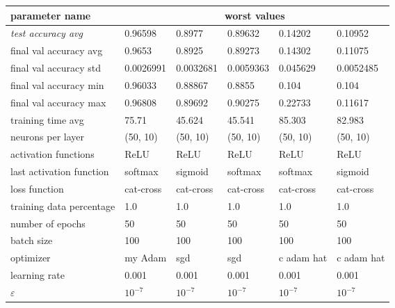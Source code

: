 \begin{longtable}{|l|l|l|l|l|>{\columncolor{worstColumnColor}}l|}
\hline
\textbf{parameter name} & \multicolumn{5}{c|}{\textbf{worst values}} \\
\hline
\textit{test accuracy avg} & 0.96598 &  0.8977 & 0.89632 & 0.14202 & 0.10952 \\
final val accuracy avg   & 0.9653  & 0.8925  & 0.89273 & 0.14302 & 0.11075 \\
final val accuracy std   & 0.0026991 & 0.0032681 & 0.0059363 & 0.045629 & 0.0052485 \\
final val accuracy min   & 0.96033 & 0.88867 & 0.8855  & 0.104   & 0.104   \\
final val accuracy max   & 0.96808 & 0.89692 & 0.90275 & 0.22733 & 0.11617 \\
training time avg        & 75.71   & 45.624  & 45.541  & 85.303  & 82.983  \\
{\color{equalParamColor} neurons per layer } & {\color{equalParamColor} (50, 10) } & {\color{equalParamColor} (50, 10) } & {\color{equalParamColor} (50, 10) } & {\color{equalParamColor} (50, 10) } & {\color{equalParamColor} (50, 10) } \\
{\color{equalParamColor} activation functions } & {\color{equalParamColor} ReLU } & {\color{equalParamColor} ReLU } & {\color{equalParamColor} ReLU } & {\color{equalParamColor} ReLU } & {\color{equalParamColor} ReLU } \\
last activation function & softmax & sigmoid & softmax & softmax & sigmoid \\
{\color{equalParamColor} loss function } & {\color{equalParamColor} cat-cross } & {\color{equalParamColor} cat-cross } & {\color{equalParamColor} cat-cross } & {\color{equalParamColor} cat-cross } & {\color{equalParamColor} cat-cross } \\
{\color{equalParamColor} training data percentage } & {\color{equalParamColor} 1.0 } & {\color{equalParamColor} 1.0 } & {\color{equalParamColor} 1.0 } & {\color{equalParamColor} 1.0 } & {\color{equalParamColor} 1.0 } \\
{\color{equalParamColor} number of epochs } & {\color{equalParamColor} 50 } & {\color{equalParamColor} 50 } & {\color{equalParamColor} 50 } & {\color{equalParamColor} 50 } & {\color{equalParamColor} 50 } \\
{\color{equalParamColor} batch size } & {\color{equalParamColor} 100 } & {\color{equalParamColor} 100 } & {\color{equalParamColor} 100 } & {\color{equalParamColor} 100 } & {\color{equalParamColor} 100 } \\
optimizer                & my Adam & sgd     & sgd     & c adam hat & c adam hat \\
{\color{equalParamColor} learning rate } & {\color{equalParamColor} 0.001 } & {\color{equalParamColor} 0.001 } & {\color{equalParamColor} 0.001 } & {\color{equalParamColor} 0.001 } & {\color{equalParamColor} 0.001 } \\
{\color{equalParamColor} $\varepsilon$ } & {\color{equalParamColor} $10^{-7}$ } & {\color{equalParamColor} $10^{-7}$ } & {\color{equalParamColor} $10^{-7}$ } & {\color{equalParamColor} $10^{-7}$ } & {\color{equalParamColor} $10^{-7}$ } \\
\hline


\end{longtable}
